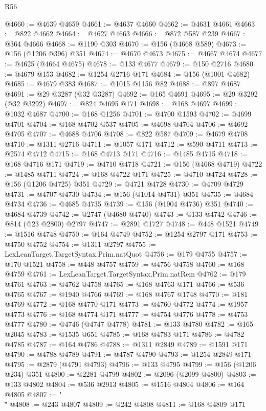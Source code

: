 \begin{lexlean}{R56}
\begin{coremodule}
@4660 := @4639 @4659
@4661 := @4637 @4660
@4662 := @4631 @4661
@4663 := @822 @4662
@4664 := @4627 @4663
@4666 := @872 @587 @239
@4667 := @364 @4666
@4668 := @1190 @303
@4670 := @156 (@4668 @589)
@4673 := @156 (@1206 @396) @351
@4674 := @4670 @4673
@4675 := @4667 @4674
@4677 := @4625 (@4664 @4675)
@4678 := @133 @4677
@4679 := @150 @2716
@4680 := @4679 @153
@4682 := @1254 @2716 @171
@4684 := @156 (@1001 @4682)
@4685 := @4679 @383
@4687 := @1015 @1156 @82
@4688 := @897 @4687
@4691 := @29 @3287 (@32 @3287)
@4692 := @165 @4691
@4695 := @29 @3292 (@32 @3292)
@4697 := @824 @4695 @171
@4698 := @168 @4697
@4699 := @1032 @4687
@4700 := @168 @1256
@4701 := @4700 @1593
@4702 := @4699 @4701
@4704 := @168 @4702 @537
@4705 := @4698 @4704
@4706 := @4692 @4705
@4707 := @4688 @4706
@4708 := @822 @587
@4709 := @4679 @4708
@4710 := @1311 @2716
@4711 := @1057 @171
@4712 := @590 @4711
@4713 := @2574 @4712
@4715 := @168 @4713 @171
@4716 := @1485 @4715
@4718 := @168 @4716 @171
@4719 := @4710 @4718
@4721 := @156 (@4668 @4719)
@4722 := @1485 @4711
@4724 := @168 @4722 @171
@4725 := @4710 @4724
@4728 := @156 (@1206 @4725) @351
@4729 := @4721 @4728
@4730 := @4709 @4729
@4731 := @4707 @4730
@4734 := @156 (@1014 @4731) @351
@4735 := @4684 @4734
@4736 := @4685 @4735
@4739 := @156 (@1904 @4736) @351
@4740 := @4684 @4739
@4742 := @2747 (@4680 @4740)
@4743 := @133 @4742
@4746 := @814 (@23 @2800) @2797
@4747 := @2891 @1727
@4748 := @448 @1521
@4749 := @1516 @4748
@4750 := @164 @4749
@4752 := @1254 @2797 @171
@4753 := @4750 @4752
@4754 := @1311 @2797
@4755 := LexLeanTarget.TargetSyntax.Prim.natQuot
@4756 := @179 @4755
@4757 := @170 @1521
@4758 := @448 @4757
@4759 := @4756 @4758
@4760 := @168 @4759
@4761 := LexLeanTarget.TargetSyntax.Prim.natRem
@4762 := @179 @4761
@4763 := @4762 @4758
@4765 := @168 @4763 @171
@4766 := @536 @4765
@4767 := @1940 @4766
@4769 := @168 @4767 @1748
@4770 := @181 @4769
@4772 := @168 @4770 @171
@4773 := @4760 @4772
@4774 := @1957 @4773
@4776 := @168 @4774 @171
@4777 := @4754 @4776
@4778 := @4753 @4777
@4780 := @4746 (@4747 @4778)
@4781 := @133 @4780
@4782 := @165 @2045
@4783 := @1535 @651
@4785 := @168 @4783 @171
@4786 := @4782 @4785
@4787 := @164 @4786
@4788 := @1311 @2849
@4789 := @1591 @171
@4790 := @4788 @4789
@4791 := @4787 @4790
@4793 := @1254 @2849 @171
@4795 := @2879 (@4791 @4793)
@4796 := @133 @4795
@4799 := @156 (@1206 @234) @351
@4800 := @2281 @4799
@4802 := @2096 (@2099 @4800)
@4803 := @133 @4802
@4804 := @536 @2913
@4805 := @1516 @4804
@4806 := @164 @4805
@4807 := "\\\""
@4808 := @243 @4807
@4809 := @242 @4808
@4811 := @168 @4809 @171

\end{coremodule}
\end{lexlean}
